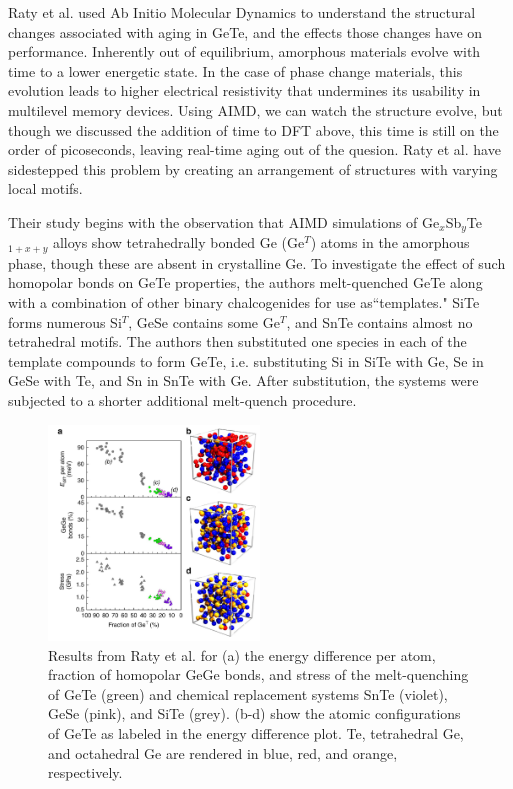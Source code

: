 \documentclass[3p,review,12pt]{elsarticle}
\begin{document}
Raty et al. \cite{Raty2015} used Ab Initio Molecular Dynamics to understand the structural changes associated with aging in GeTe, and the effects those changes have on performance. Inherently out of equilibrium, amorphous materials evolve with time to a lower energetic state. In the case of phase change materials, this evolution leads to higher electrical resistivity that undermines its usability in multilevel memory devices. Using AIMD, we can watch the structure evolve, but though we discussed the addition of time to DFT above, this time is still on the order of picoseconds, leaving real-time aging out of the quesion. Raty et al. have sidestepped this problem by creating an arrangement of structures with varying local motifs. 
\par
Their study begins with the observation that AIMD simulations of Ge$_{x}$Sb$_{y}$Te$_{1+x+y}$ alloys show tetrahedrally bonded Ge (Ge$^{T}$) atoms in the amorphous phase, though these are absent in crystalline Ge. To investigate the effect of such homopolar bonds on GeTe properties, the authors melt-quenched GeTe along with a combination of other binary chalcogenides for use as``templates." SiTe forms numerous Si$^{T}$, GeSe contains some Ge$^{T}$, and SnTe contains almost no tetrahedral motifs.  The authors then substituted one species in each of the template compounds to form GeTe, i.e. substituting Si in SiTe with Ge, Se in GeSe with Te, and Sn in SnTe with Ge. After substitution, the systems were subjected to a shorter additional melt-quench procedure.
\begin{figure}[h]
	\includegraphics[width=0.5\textwidth]{raty1}
	\centering
	\caption{Results from Raty et al. \cite{Raty2015} for (a) the energy difference per atom, fraction of homopolar GeGe bonds, and stress of the melt-quenching of GeTe (green) and chemical replacement systems SnTe (violet), GeSe (pink), and SiTe (grey). (b-d) show the atomic configurations of GeTe as labeled in the energy difference plot. Te, tetrahedral Ge, and octahedral Ge are rendered in blue, red, and orange, respectively.} 
\end{figure}
\end{document}
